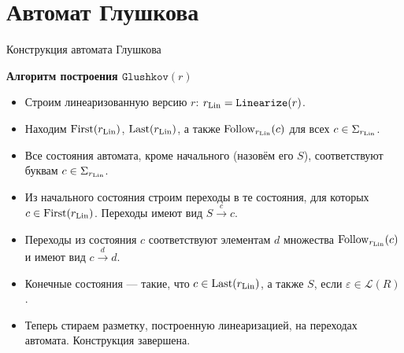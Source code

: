 \documentclass[mathserif]{beamer}
\newcommand{\Lang}{\mathscr{L}} %
\def\Linearize{\mathtt{Linearize}} %
\def\First{\mathrm{First}} %
\def\Last{\mathrm{Last}}
\def\Follow{\mathrm{Follow}}
\def\Glushkov{\mathtt{Glushkov}}
\newcommand{\empt}{\varepsilon} %
\newcommand{\rar}{\rightarrow} %
\begin{document}
\section{Автомат Глушкова}
\begin{frame}{Конструкция автомата Глушкова}
    \begin{block}{\bf Алгоритм построения $\Glushkov(r)$}
        \begin{itemize}
            \item Строим линеаризованную версию $r$: $r_{\rm Lin} =\Linearize(r)$.
            \item Находим $\First(r_{\rm Lin})$, $\Last(r_{\rm Lin})$, а также $\Follow_{r_{\rm Lin}}(c)$ для всех $c\in\Sigma_{r_{\rm Lin}}$.
            \item Все состояния автомата, кроме начального (назовём его $S$), соответствуют буквам $c\in\Sigma_{r_{\rm Lin}}$.
            \item Из начального состояния строим переходы в те состояния, для которых $c\in\First(r_{\rm Lin})$. Переходы имеют вид $S\overset{c}{\rar}{c}$.
            \item Переходы из состояния $c$ соответствуют элементам $d$ множества $\Follow_{r_{\rm Lin}}(c)$ и имеют вид $c\overset{d}{\rar}{d}$.
            \item Конечные состояния --- такие, что $c\in\Last(r_{\rm Lin})$, а также $S$, если $\empt\in\Lang(R)$.
            \item Теперь стираем разметку, построенную линеаризацией, на переходах автомата. Конструкция завершена.
        \end{itemize}
    \end{block} %
\end{frame}
\end{document}
